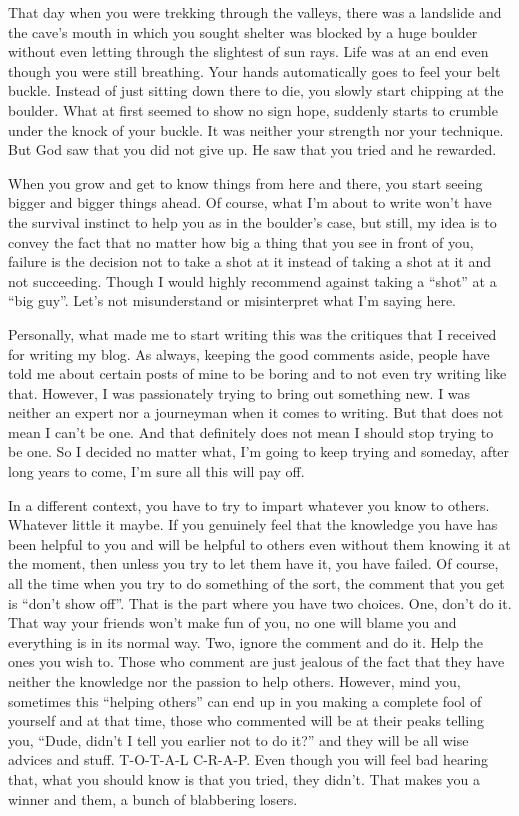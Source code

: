 \documentclass[twoside,11pt]{article}
\begin{document}
That day when you were trekking through the valleys, there was a landslide and the cave's mouth in which you sought shelter was blocked by a huge boulder without even letting through the slightest of sun rays. Life was at an end even though you were still breathing. Your hands automatically goes to feel your belt buckle. Instead of just sitting down there to die, you slowly start chipping at the boulder. What at first seemed to show no sign hope, suddenly starts to crumble under the knock of your buckle. It was neither your strength nor your technique. But God saw that you did not give up. He saw that you tried and he rewarded.

When you grow and get to know things from here and there, you start seeing bigger and bigger things ahead. Of course, what I'm about to write won't have the survival instinct to help you as in the boulder's case, but still, my idea is to convey the fact that no matter how big a thing that you see in front of you, failure is the decision not to take a shot at it instead of taking a shot at it and not succeeding. Though I would highly recommend against taking a ``shot'' at a ``big guy''. Let's not misunderstand or misinterpret what I'm saying here.

Personally, what made me to start writing this was the critiques that I received for writing my blog. As always, keeping the good comments aside, people have told me about certain posts of mine to be boring and to not even try writing like that. However, I was passionately trying to bring out something new. I was neither an expert nor a journeyman when it comes to writing. But that does not mean I can't be one. And that definitely does not mean I should stop trying to be one. So I decided no matter what, I'm going to keep trying and someday, after long years to come, I'm sure all this will pay off.

In a different context, you have to try to impart whatever you know to others. Whatever little it maybe. If you genuinely feel that the knowledge you have has been helpful to you and will be helpful to others even without them knowing it at the moment, then unless you try to let them have it, you have failed. Of course, all the time when you try to do something of the sort, the comment that you get is ``don’t show off''. That is the part where you have two choices. One, don't do it. That way your friends won't make fun of you, no one will blame you and everything is in its normal way. Two, ignore the comment and do it. Help the ones you wish to. Those who comment are just jealous of the fact that they have neither the knowledge nor the passion to help others. However, mind you, sometimes this ``helping others'' can end up in you making a complete fool of yourself and at that time, those who commented will be at their peaks telling you, ``Dude, didn't I tell you earlier not to do it?'' and they will be all wise advices and stuff. T-O-T-A-L C-R-A-P. Even though you will feel bad hearing that, what you should know is that you tried, they didn't. That makes you a winner and them, a bunch of blabbering losers.
\end{document}
